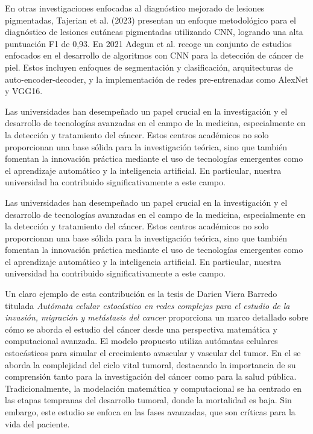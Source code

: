 En otras investigaciones enfocadas al diagnóstico mejorado de lesiones pigmentadas, Tajerian et al. (2023)  presentan un enfoque metodológico para el diagnóstico de lesiones cutáneas pigmentadas utilizando CNN, logrando una alta puntuación F1 de 0,93. En 2021 Adegun et al.  recoge un conjunto de estudios enfocados en el desarrollo de algoritmos con CNN para la detección de cáncer de piel. Estos incluyen enfoques de segmentación y clasificación, arquitecturas de auto-encoder-decoder, y la implementación de redes pre-entrenadas como AlexNet y VGG16.

Las universidades han desempeñado un papel crucial en la investigación y el desarrollo de tecnologías avanzadas en el campo de la medicina, especialmente en la detección y tratamiento del cáncer. Estos centros académicos no solo proporcionan una base sólida para la investigación teórica, sino que también fomentan la innovación práctica mediante el uso de tecnologías emergentes como el aprendizaje automático y la inteligencia artificial. En particular, nuestra universidad ha contribuido significativamente a este campo.

Las universidades han desempeñado un papel crucial en la investigación y el desarrollo de tecnologías avanzadas en el campo de la medicina, especialmente en la detección y tratamiento del cáncer. Estos centros académicos no solo proporcionan una base sólida para la investigación teórica, sino que también fomentan la innovación práctica mediante el uso de tecnologías emergentes como el aprendizaje automático y la inteligencia artificial. En particular, nuestra universidad ha contribuido significativamente a este campo.

Un claro ejemplo de esta contribución es la tesis de Darien Viera Barredo titulada \textit{Autómata celular estocástico en redes complejas para el estudio de la invasión, migración y metástasis del cancer}  proporciona un marco detallado sobre cómo se aborda el estudio del cáncer desde una perspectiva matemática y computacional avanzada. El modelo propuesto utiliza autómatas celulares estocásticos para simular el crecimiento avascular y vascular del tumor. En el se aborda la complejidad del ciclo vital tumoral, destacando la importancia de su comprensión tanto para la investigación del cáncer como para la salud pública. Tradicionalmente, la modelación matemática y computacional se ha centrado en las etapas tempranas del desarrollo tumoral, donde la mortalidad es baja. Sin embargo, este estudio se enfoca en las fases avanzadas, que son críticas para la vida del paciente.

